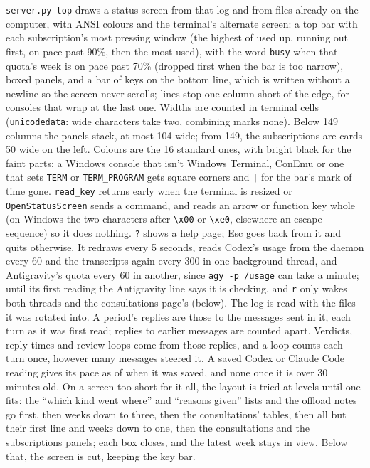 \documentclass[10pt,a4paper]{article}
\newcommand{\code}[1]{\texttt{#1}}
\begin{document}
\code{server.py top} draws a status screen from that log and from files already on the computer,
with ANSI colours and the terminal's alternate screen: a top bar with each subscription's most
pressing window (the highest of used up, running out first, on pace past 90\%, then the most
used), with the word \code{busy} when that quota's week is on pace past 70\% (dropped first when the
bar is too narrow), boxed panels, and a bar of keys on the bottom line, which is written without a newline so
the screen never scrolls; lines stop one column short of the edge, for consoles that wrap at the
last one. Widths are counted in terminal cells (\code{unicodedata}: wide characters take two,
combining marks none). Below 149 columns the panels stack, at most 104 wide; from 149, the
subscriptions are cards 50 wide on the left. Colours are the 16 standard ones, with bright black
for the faint parts; a Windows console that isn't Windows Terminal, ConEmu or one that sets
\code{TERM} or \code{TERM\_PROGRAM} gets square corners and \code{|} for the bar's mark of time gone.
\code{read\_key} returns early when the terminal is resized or \code{OpenStatusScreen} sends a command, and reads an arrow or function key
whole (on Windows the two characters after \code{\textbackslash x00} or \code{\textbackslash xe0}, elsewhere an
escape sequence) so it does nothing. \code{?} shows a help page; Esc goes back from it and quits
otherwise. It redraws every 5 seconds, reads Codex's
usage from the daemon every 60 and the transcripts again every 300 in one background thread, and
Antigravity's quota every 60 in another, since \code{agy -p /usage} can take a minute; until its
first reading the Antigravity line says it is checking, and \code{r} only wakes both threads and
the consultations page's (below). The
log is read with the files it was rotated into. A period's replies are those to the messages
sent in it, each turn as it was first read; replies to earlier messages are counted apart.
Verdicts, reply times and review loops come from those replies, and a loop counts each turn once,
however many messages steered it. A saved Codex or Claude Code reading gives its pace as of when
it was saved, and none once it is over 30 minutes old. On a screen too short for it all, the
layout is tried at levels until one fits: the ``which kind went where'' and ``reasons given''
lists and the offload notes go first, then weeks down to three, then the consultations' tables,
then all but their first line and weeks down to one, then the consultations and the
subscriptions panels; each box closes, and the latest week stays in view. Below that, the
screen is cut, keeping the key bar.
\end{document}
